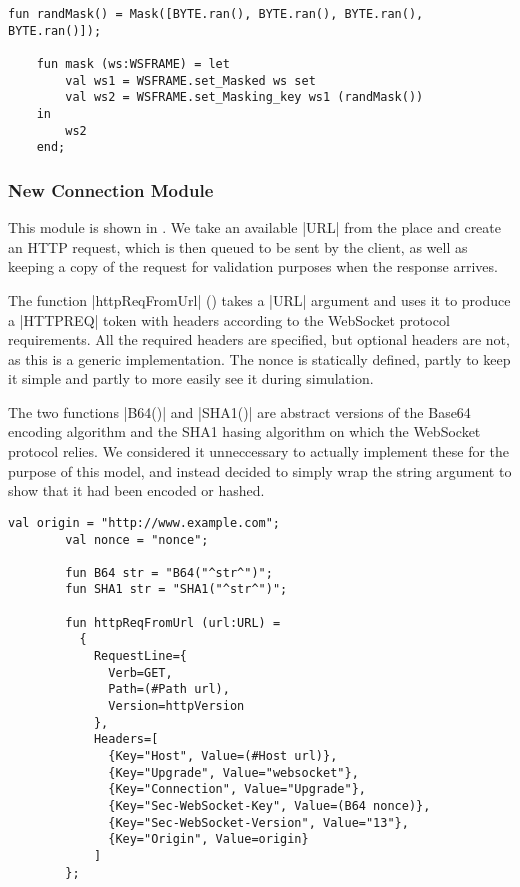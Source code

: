 	\begin{lstlisting}[label=lst:mask_fun,caption=Masking functions
	,gobble=1,float=h]
	fun randMask() = Mask([BYTE.ran(), BYTE.ran(), BYTE.ran(), BYTE.ran()]);
  
	fun mask (ws:WSFRAME) = let
		val ws1 = WSFRAME.set_Masked ws set
		val ws2 = WSFRAME.set_Masking_key ws1 (randMask())
	in 
		ws2
	end;
	\end{lstlisting}
     
	\subsubsection{New Connection Module}
		
		
		This module is shown in . We take an available |URL| from the
		 place and create an HTTP request, which is then
		queued to be sent by the client, as well as keeping a copy of the request for
		validation purposes when the response arrives.
		
		The function |httpReqFromUrl| () takes a |URL| argument
		and uses it to produce a |HTTPREQ| token with headers according to the WebSocket
		protocol requirements.
		All the required headers are specified, but optional headers are not, as this
		is a generic implementation. The nonce is statically defined, partly to keep
		it simple and partly to more easily see it during simulation. 

		The two functions |B64()| and |SHA1()| are
		abstract versions of the Base64 encoding algorithm \cite{rfc4648} and the SHA1
		hasing algorithm \cite{fips.180-2} on which the WebSocket protocol relies. We
		considered it unneccessary to actually implement these for the purpose of
		this model, and instead decided to simply wrap the string argument to show
		that it had been encoded or hashed.
		
		\begin{lstlisting}[label=lst:httpReqFromUrl,caption=httpReqFromUrl,gobble=2,float]
		val origin = "http://www.example.com";
		val nonce = "nonce";
		
		fun B64 str = "B64("^str^")";
		fun SHA1 str = "SHA1("^str^")";
		
		fun httpReqFromUrl (url:URL) = 
          {
            RequestLine={
              Verb=GET, 
              Path=(#Path url),
              Version=httpVersion
            },
            Headers=[
              {Key="Host", Value=(#Host url)},
              {Key="Upgrade", Value="websocket"},
              {Key="Connection", Value="Upgrade"},
              {Key="Sec-WebSocket-Key", Value=(B64 nonce)},
              {Key="Sec-WebSocket-Version", Value="13"},
              {Key="Origin", Value=origin}
            ]
		};
		\end{lstlisting}
		
